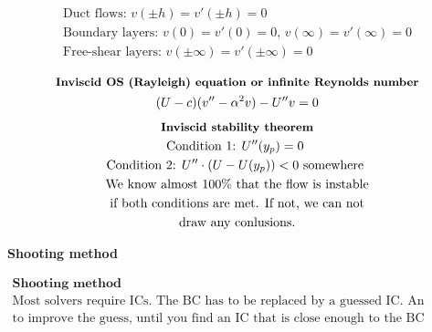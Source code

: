 \documentclass[10pt, a4paper]{article}
\begin{document}
\begin{multicols*}{2}
\begin{gather*}
        \text{Duct flows: } v(\pm h) = v'(\pm h) = 0 \\
        \text{Boundary layers: } v(0) = v'(0) = 0 \text{, } v(\infty) = v'(\infty) = 0 \\
        \text{Free-shear layers: } v(\pm \infty) = v'(\pm \infty) = 0 \\
    \end{gather*}
    \begin{gather*}
        \textbf{\small Inviscid OS (Rayleigh) equation or infinite Reynolds number} \\
        (U - c)(v''-\alpha^2 v) - U''v = 0
    \end{gather*}
    \begin{gather*}
        \textbf{\small Inviscid stability theorem} \\
        \text{Condition 1: $U''(y_p) = 0$ } \\
        \text{Condition 2: $U''\cdot(U-U(y_p)) < 0$ somewhere } \\
        \text{We know almost 100\% that the flow is instable}\\
        \text{if both conditions are met. If not, we can not} \\
        \text{draw any conlusions.}
    \end{gather*}
\end{multicols*}

\begin{center}
    \Large
    \textbf{Shooting method}
    \vspace{0.5cm}
\end{center}
\begin{multicols*}{2}
    \begin{gather*}
        \textbf{Shooting method} \\
        \text{Most solvers require ICs. The BC has to be replaced by a guessed IC. An iterative process uses this guess} \\
        \text{to improve the guess, until you find an IC that is close enough to the BC prescribed.} \\ %
    \end{gather*}
\end{multicols*}
\end{document}
